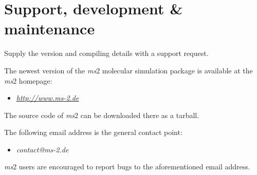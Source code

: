 \section{Support, development \& maintenance}
\label{sec:Support, Development maintenance}

Supply the version and compiling details with a support request.

The newest version of the \textit{ms}2 molecular simulation package is available at the \textit{ms}2 homepage:
\begin{itemize}
	\item[ ] \href{http://www.ms-2.de}{\textit{http://www.ms-2.de} }
\end{itemize}
The source code of \textit{ms}2 can be downloaded there as a tarball. 

The following email address is the general contact point:
\begin{itemize}
	\item[ ] \textit{contact@ms-2.de}
\end{itemize}
\textit{ms}2 users are encouraged to report bugs to the aforementioned email address.




